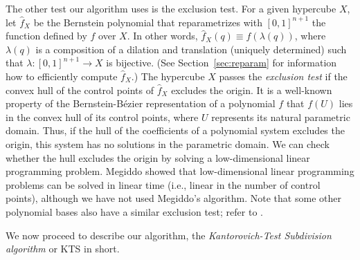 \documentclass{article}
\begin{document}
The other test our algorithm uses is the exclusion test. For a
given hypercube $X$, let $\hat{f}_X$ be the Bernstein polynomial
that reparametrizes with $[0,1]^{n+1}$ the function defined by $f$ over
$X$.  In other words, $\hat{f}_X(q)\equiv f(\lambda(q))$, where
$\lambda(q)$ is a composition of a dilation and translation
(uniquely determined) such that $\lambda:[0,1]^{n+1}\rightarrow X$ is
bijective.  (See Section~\ref{sec:reparam} for information how to
efficiently compute $\hat {f}_X$.)
The hypercube $X$ passes the \emph{exclusion test} if the
convex hull of the control points of $\hat{f}_X$ excludes the
origin.  It is a well-known property of the Bernstein-B\'ezier representation
of a polynomial $f$ that $f(U)$
lies in the convex hull of its control
points, where $U$ represents its natural parametric domain.
Thus, if the hull of the coefficients of a polynomial system
excludes the origin, this system has no solutions in the parametric domain.
We can check whether the hull excludes the origin by solving a low-dimensional
linear programming problem.  Megiddo \cite{Megiddo} showed that low-dimensional linear
programming problems can be solved in linear time (i.e., linear in the number
of control points), although we have not used Megiddo's algorithm.
Note that some other polynomial bases also have a similar exclusion test;
refer to \cite{srijuntongsiri_basis}.

We now proceed to describe our algorithm, the
\emph{Kantorovich-Test Subdivision algorithm} or KTS in short.
\end{document}
